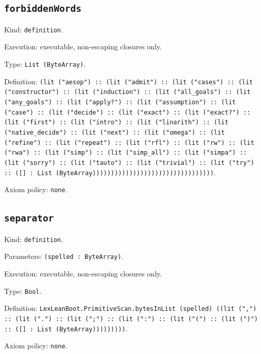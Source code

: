 \documentclass[11pt]{article}
\begin{document}
\subsection*{\texttt{forbiddenWords}}
\noindent Kind: \texttt{definition}.\par
\noindent Execution: executable, non-escaping closures only.\par
\noindent Type: \texttt{List (ByteArray)}.\par
\noindent Definition: \texttt{(lit ("aesop") :: (lit ("admit") :: (lit ("cases") :: (lit ("constructor") :: (lit ("induction") :: (lit ("all\_goals") :: (lit ("any\_goals") :: (lit ("apply?") :: (lit ("assumption") :: (lit ("case") :: (lit ("decide") :: (lit ("exact") :: (lit ("exact?") :: (lit ("first") :: (lit ("intro") :: (lit ("linarith") :: (lit ("native\_decide") :: (lit ("next") :: (lit ("omega") :: (lit ("refine") :: (lit ("repeat") :: (lit ("rfl") :: (lit ("rw") :: (lit ("rwa") :: (lit ("simp") :: (lit ("simp\_all") :: (lit ("simpa") :: (lit ("sorry") :: (lit ("tauto") :: (lit ("trivial") :: (lit ("try") :: ([] : List (ByteArray)))))))))))))))))))))))))))))))))}.\par
\noindent Axiom policy: \texttt{none}.\par
\subsection*{\texttt{separator}}
\noindent Kind: \texttt{definition}.\par
\noindent Parameters: \texttt{(spelled : ByteArray)}.\par
\noindent Execution: executable, non-escaping closures only.\par
\noindent Type: \texttt{Bool}.\par
\noindent Definition: \texttt{LexLeanBoot.PrimitiveScan.bytesInList (spelled) ((lit (",") :: (lit (".") :: (lit (";") :: (lit (":") :: (lit ("(") :: (lit (")") :: ([] : List (ByteArray)))))))))}.\par
\noindent Axiom policy: \texttt{none}.\par
\end{document}
